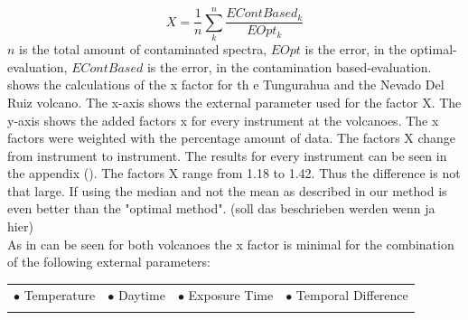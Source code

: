 \documentclass  [
  paper    = a4,
  BCOR     = 10mm,
  twoside,
  fontsize = 12pt,
  fleqn,
  toc      = bibnumbered,
  toc      = listofnumbered,
  numbers  = noendperiod,
  headings = normal,
  listof   = leveldown,
  version  = 3.03
]                                       {scrreprt}
\begin{document}
	\begin{equation}
	X = \frac{1}{n}\sum_{k}^{n} \frac{EContBased_{ k}}{EOpt_{ k}}
	\label{eq:mean}
	\end{equation}
	$n$ is the total amount of contaminated spectra, $EOpt$ is the   error, in the optimal-evaluation, $EContBased$ is the   error, in the contamination based-evaluation. 
	 shows the calculations of the x factor for th e Tungurahua and the Nevado Del Ruiz volcano. The x-axis shows the external parameter used for the factor X. The y-axis shows the added factors x for every instrument at the volcanoes. The x factors were weighted with the percentage amount of data.
	The factors X change from instrument to instrument. The results for every instrument can be seen in the appendix (). The factors X range from 1.18 to 1.42. Thus the difference is not that large. 
	If using the median and not the mean as described in  our method is even better than the "optimal method". (soll das beschrieben werden wenn ja hier)\\
	As in  can be seen  for both volcanoes the x factor is minimal for the combination of the following external parameters:\\
	
	\begin{table}[h!]
			\begin{tabular}{cccc}
		$\bullet$ Temperature & $\bullet$ Daytime&  $\bullet$ Exposure Time & $\bullet$ Temporal Difference\\
		\label{tab:importantexternalParam}
		\end{tabular}
	\end{table}
%	
\end{document}
